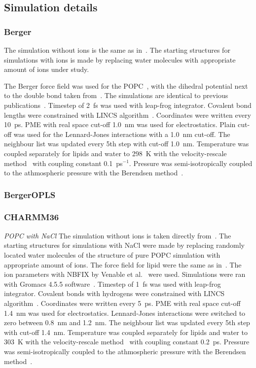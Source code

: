 \documentclass[pre,aps,floatfix,authordate1-4,twocolumn]{revtex4-1}
\begin{document}
\subsection{Simulation details}
\subsubsection{Berger}
The simulation without ions is the same as in~\cite{botan15}. The starting structures for simulations with ions is
made by replacing water molecules with appropriate amount of ions under study.

The Berger force field was used for the POPC~\cite{berger97}, with the dihedral potential next to the double bond 
taken from~\cite{bachar04}. The simulations are identical to previous publications~\cite{ollila07a,ferreira13,ferreira15}.
Timestep of 2~fs was used with leap-frog integrator. Covalent bond lengths were constrained with LINCS algorithm~\cite{hess97,hess07}. 
Coordinates were written every 10~ps. PME with real space cut-off 1.0~nm was used 
for electrostatics. Plain cut-off was used for the Lennard-Jones interactions with a 1.0~nm cut-off.
The neighbour list was updated every 5th step with cut-off 1.0~nm. Temperature was coupled separately
for lipids and water to 298~K with the velocity-rescale method~\cite{bussi07} with coupling constant 0.1~ps$^{-1}$.
Pressure was semi-isotropically coupled to the athmospheric pressure with the Berendsen method~\cite{berendsen84}.

\subsubsection{BergerOPLS}

\subsubsection{CHARMM36}
{\it POPC with NaCl}
The simulation without ions is taken directly from~\cite{botan15,charmm36filesSHORT}. 
The starting structures for simulations with NaCl were made by replacing randomly located 
water molecules of the structure of pure POPC simulation with appropriate amount of ions.
The force field for lipid were the same as in~\cite{botan15,charmm36filesSHORT}.
The ion parameters with NBFIX by Venable et al.~\cite{venable13} were used.
Simulations were ran with Gromacs 4.5.5 software~\cite{pronk13}.
Timestep of 1~fs was used with leap-frog integrator. Covalent bonds with hydrogens were constrained with LINCS algorithm~\cite{hess97,hess07}. 
Coordinates were written every 5~ps. PME with real space cut-off 1.4~nm was used 
for electrostatics. Lennard-Jones interactions were switched to zero between 0.8~nm and 1.2~nm.
The neighbour list was updated every 5th step with cut-off 1.4~nm. Temperature was coupled separately
for lipids and water to 303~K with the velocity-rescale method~\cite{bussi07} with coupling constant 0.2~ps.
Pressure was semi-isotropically coupled to the athmospheric pressure with the Berendsen method~\cite{berendsen84}.
\end{document}
